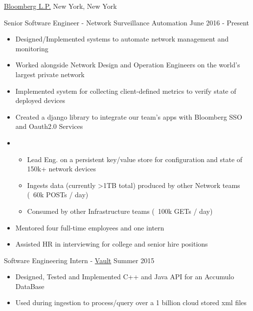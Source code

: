 \documentclass[11pt]{article}
\begin{document}
\headedsection  %
{\href{http://www.bloomberg.com/company}{Bloomberg L.P.}}
{New York, New York}
{
    \headedsubsection
    {Senior Software Engineer - Network Surveillance Automation}
    {June 2016 - Present}
    {
        \begin{itemize}
            \item Designed/Implemented systems to automate network management and monitoring
            \item Worked alongside Network Design and Operation Engineers on the world's largest private network
            \item Implemented system for collecting client-defined metrics to verify state of deployed devices
            \item Created a django library to integrate our team's apps with Bloomberg SSO and Oauth2.0 Services
            \item{}
            { \begin{itemize}
                \item Lead Eng. on a persistent key/value store for configuration and state of 150k+ network devices
                \item Ingests data (currently >1TB total) produced by other Network teams (~60k POSTs / day)
                \item Consumed by other Infrastructure teams (~100k GETs / day)
                \end{itemize} }
            \item Mentored four full-time employees and one intern
            \item Assisted HR in interviewing for college and senior hire positions
        \end{itemize}

    }
}
\headedsection  %
{}
{}
{
    \headedsubsection
    {Software Engineering Intern - \href{https://www.bloomberg.com/professional/product/vault/}{Vault}}
    {Summer 2015}
    {
        \begin{itemize}
            \item Designed, Tested and Implemented C++ and Java API for an Accumulo DataBase
            \item Used during ingestion to process/query over a 1 billion cloud stored xml files
        \end{itemize}
    }
}
\end{document}
